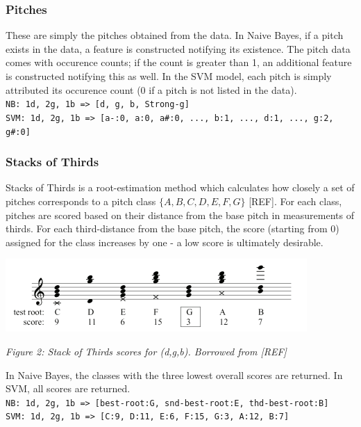 \documentclass[12pt]{article}
\begin{document}
\subsubsection{Pitches}

These are simply the pitches obtained from the data. In Naive Bayes, if a pitch exists in the data, a feature is constructed notifying its existence. The pitch data comes with occurence counts; if the count is greater than 1, an additional feature is constructed notifying this as well. In the SVM model, each pitch is simply attributed its occurence count (0 if a pitch is not listed in the data). \\


\texttt{NB:  1d, 2g, 1b => [d, g, b, Strong-g]}\\
\texttt{SVM:  1d, 2g, 1b => [a-:0, a:0, a\#:0, ..., b:1, ..., d:1, ..., g:2, g\#:0]}

\subsubsection{Stacks of Thirds}
Stacks of Thirds is a root-estimation method which calculates how closely a set of pitches corresponds to a pitch class $\{A,B,C,D,E,F,G\}$ [REF]. For each class, pitches are scored based on their distance from the base pitch in measurements of thirds. For each third-distance from the base pitch, the score (starting from 0) assigned for the class increases by one - a low score is ultimately desirable. 

\begin{center}
\includegraphics[trim = 0 0 0 0, scale=0.65]{stackOfThirds.png}
\end{center}
\begin{center}\emph{Figure 2: Stack of Thirds scores for (d,g,b). Borrowed from [REF]}\\ \end{center}

In Naive Bayes, the classes with the three lowest overall scores are returned. In SVM, all scores are returned.\\

\texttt{NB:  1d, 2g, 1b => [best-root:G, snd-best-root:E, thd-best-root:B]}\\
\texttt{SVM:  1d, 2g, 1b => [C:9, D:11, E:6, F:15, G:3, A:12, B:7]}
\end{document}
